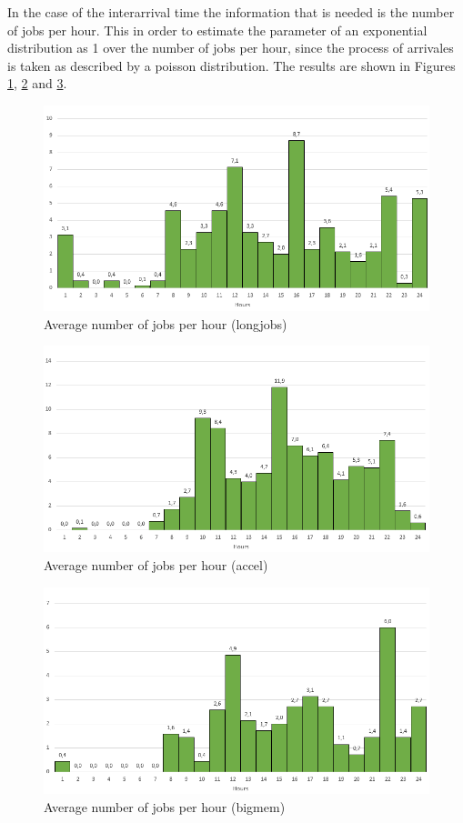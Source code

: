 \documentclass{wscpaperproc}
\begin{document}
In the case of the interarrival time the information that is needed is the
number of jobs per hour. This in order to estimate the parameter of an
exponential distribution as 1 over the number of jobs per hour, since the
process of arrivales is taken as described by a poisson distribution.
The results are shown in Figures \ref{arrival_longjobs}, \ref{arrival_accel} and
\ref{arrival_bigmem}.

\begin{figure}[h!]
\includegraphics[width=\textwidth]{./images/average_arrivals_longjobs}
\caption{Average number of jobs per hour (longjobs)}
\label{arrival_longjobs}
\end{figure}

\begin{figure}[h!]
\includegraphics[width=\textwidth]{./images/average_arrivals_accel}
\caption{Average number of jobs per hour (accel)}
\label{arrival_accel}
\end{figure}

\begin{figure}[h!]
\includegraphics[width=\textwidth]{./images/average_arrivals_bigmem}
\caption{Average number of jobs per hour (bigmem)}
\label{arrival_bigmem}
\end{figure}
\end{document}
